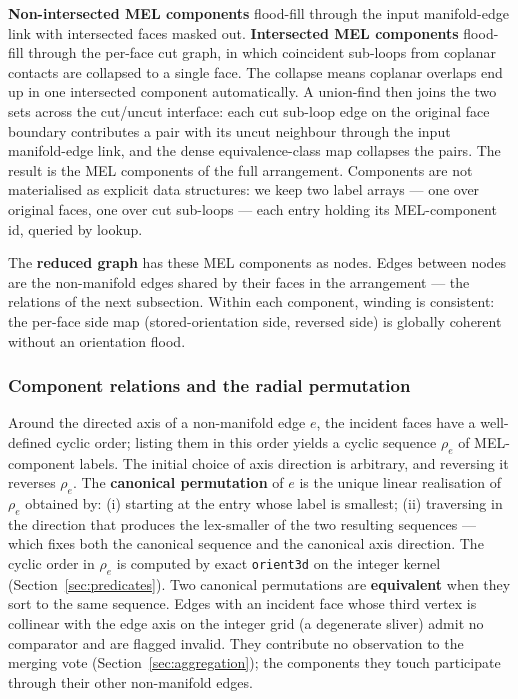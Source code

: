 \documentclass{egpubl}
\begin{document}
\textbf{Non-intersected MEL components} flood-fill through the input manifold-edge link with intersected faces masked out. \textbf{Intersected MEL components} flood-fill through the per-face cut graph, in which coincident sub-loops from coplanar contacts are collapsed to a single face. The collapse means coplanar overlaps end up in one intersected component automatically. A union-find then joins the two sets across the cut/uncut interface: each cut sub-loop edge on the original face boundary contributes a pair with its uncut neighbour through the input manifold-edge link, and the dense equivalence-class map collapses the pairs. The result is the MEL components of the full arrangement. Components are not materialised as explicit data structures: we keep two label arrays --- one over original faces, one over cut sub-loops --- each entry holding its MEL-component id, queried by lookup.

The \textbf{reduced graph} has these MEL components as nodes. Edges between nodes are the non-manifold edges shared by their faces in the arrangement --- the relations of the next subsection. Within each component, winding is consistent: the per-face side map (stored-orientation side, reversed side) is globally coherent without an orientation flood.

\subsubsection*{Component relations and the radial permutation}

Around the directed axis of a non-manifold edge $e$, the incident faces have a well-defined cyclic order; listing them in this order yields a cyclic sequence $\rho_e$ of MEL-component labels. The initial choice of axis direction is arbitrary, and reversing it reverses $\rho_e$. The \textbf{canonical permutation} of $e$ is the unique linear realisation of $\rho_e$ obtained by: (i) starting at the entry whose label is smallest; (ii) traversing in the direction that produces the lex-smaller of the two resulting sequences --- which fixes both the canonical sequence and the canonical axis direction. The cyclic order in $\rho_e$ is computed by exact \texttt{orient3d} on the integer kernel (Section~\ref{sec:predicates}). Two canonical permutations are \textbf{equivalent} when they sort to the same sequence. Edges with an incident face whose third vertex is collinear with the edge axis on the integer grid (a degenerate sliver) admit no comparator and are flagged invalid. They contribute no observation to the merging vote (Section~\ref{sec:aggregation}); the components they touch participate through their other non-manifold edges.
\end{document}
